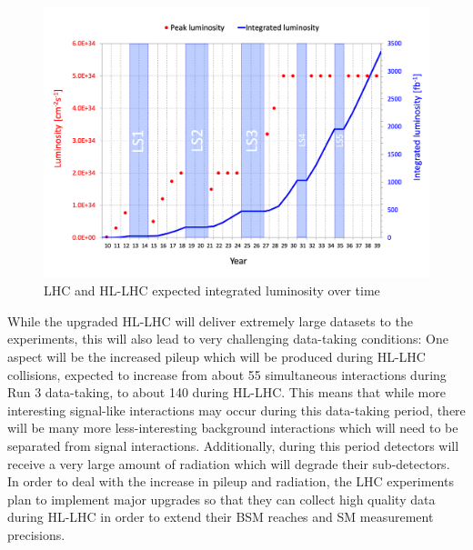 \begin{figure}[H]
    \centering
    \includegraphics[width=\textwidth]{Images/LHC/LHC-nom-lumi-proj-with-ions.png}
    \caption{LHC and HL-LHC expected integrated luminosity over time} %
    \label{fig:LHC_Int_Lumi}
\end{figure}

While the upgraded HL-LHC will deliver extremely large datasets to the experiments, this will also lead to very challenging data-taking conditions: One aspect will be the increased pileup which will be produced during HL-LHC collisions, expected to increase from about 55 simultaneous interactions during Run 3 data-taking, to about 140 during HL-LHC. This means that while more interesting signal-like interactions may occur during this data-taking period, there will be many more less-interesting background interactions which will need to be separated from signal interactions. Additionally, during this period detectors will receive a very large amount of radiation which will degrade their sub-detectors. In order to deal with the increase in pileup and radiation, the LHC experiments plan to implement major upgrades so that they can collect high quality data during HL-LHC in order to extend their BSM reaches and SM measurement precisions. 